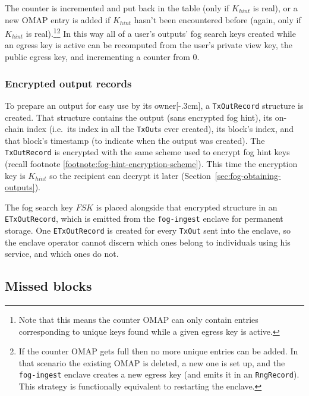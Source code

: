 The counter is incremented and put back in the table (only if $K_{hint}$ is real), or a new OMAP entry is added if $K_{hint}$ hasn't been encountered before (again, only if $K_{hint}$ is real).\footnote{Note that this means the counter OMAP can only contain entries corresponding to unique keys found while a given egress key is active.}\footnote{If the counter OMAP gets full then no more unique entries can be added. In that scenario the existing OMAP is deleted, a new one is set up, and the {\tt fog-ingest} enclave creates a new egress key (and emits it in an {\tt RngRecord}). This strategy is functionally equivalent to restarting the enclave.} In this way all of a user's outputs' fog search keys created while an egress key is active can be recomputed from the user's private view key, the public egress key, and incrementing a counter from 0.

\subsubsection{Encrypted output records}

To prepare an output for easy use by its owner[-.3cm], a {\tt TxOutRecord} structure is created. That structure contains the output (sans encrypted fog hint), its on-chain index (i.e.\ its index in all the {\tt TxOut}s ever created), its block's index, and that block's timestamp (to indicate when the output was created). The {\tt TxOutRecord} is encrypted with the same scheme used to encrypt fog hint keys (recall footnote \ref{footnote:fog-hint-encryption-scheme}). This time the encryption key is $K_{hint}$ so the recipient can decrypt it later (Section~\ref{sec:fog-obtaining-outputs}).

The fog search key $FSK$ is placed alongside that encrypted structure in an {\tt ETxOutRecord}, which is emitted from the {\tt fog-ingest} enclave for permanent storage. One {\tt ETxOutRecord} is created for every {\tt TxOut} sent into the enclave, so the enclave operator cannot discern which ones belong to individuals using his service, and which ones do not.


\subsection{Missed blocks}
\label{subsec:fog-missed-blocks}

